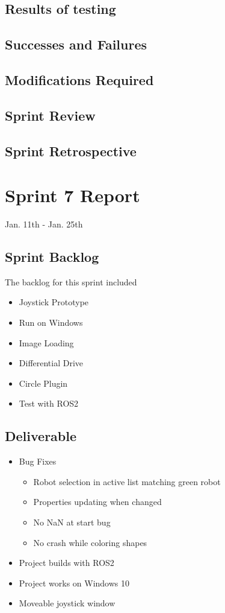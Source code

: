 \subsection{Results of testing}


\subsection{Successes and Failures}


\subsection{Modifications Required}


\subsection{Sprint Review}


\subsection{Sprint Retrospective}

\section{Sprint 7 Report}
Jan. 11th - Jan. 25th
\subsection{Sprint Backlog}

The backlog for this sprint included 

\begin{itemize}
	\item Joystick Prototype
	\item Run on Windows
	\item Image Loading
	\item Differential Drive
	\item Circle Plugin
	\item Test with ROS2
\end{itemize}

\subsection{Deliverable}

\begin{itemize}
	\item Bug Fixes	
\begin{itemize}
	\item Robot selection in active list matching green robot
	\item Properties updating when changed
	\item No NaN at start bug
	\item No crash while coloring shapes
	
\end{itemize}
	\item Project builds with ROS2
	\item Project works on Windows 10
	\item Moveable joystick window
\end{itemize}


